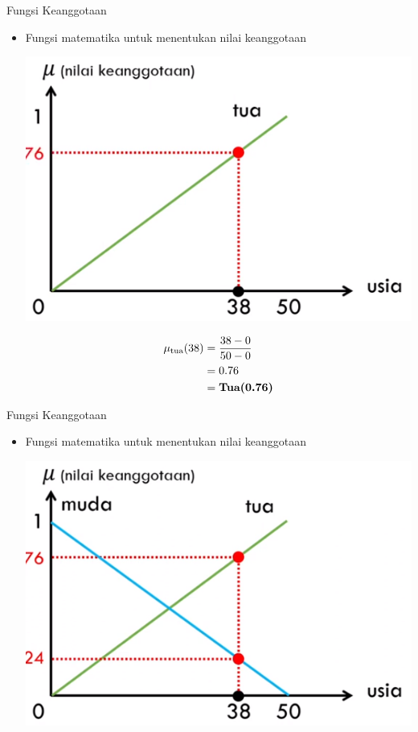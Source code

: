 \documentclass[pdflatex,compress,mathserif]{beamer}
\begin{document}
\begin{frame}{Fungsi Keanggotaan}
	\begin{itemize}
		\item Fungsi matematika untuk menentukan nilai keanggotaan
		\begin{multicols}{2}
			\begin{center}
				\includegraphics[width=\linewidth]{img/09}
			\end{center}
			\columnbreak
			\begin{align*}
				\mu_{\text{tua}}(38) &= \frac{38 - 0}{50 - 0} \\
				&= 0.76 \\
				&= \text{\textbf{Tua(0.76)}}
			\end{align*}
		\end{multicols}
	\end{itemize}
\end{frame}

\begin{frame}{Fungsi Keanggotaan}
	\begin{itemize}
		\item Fungsi matematika untuk menentukan nilai keanggotaan
		\begin{center}
			\includegraphics[width=0.5\linewidth]{img/10}
		\end{center}
	\end{itemize}
\end{frame}
\end{document}
